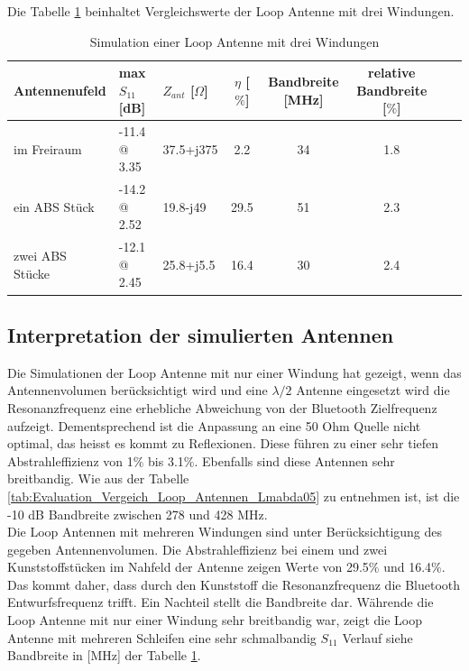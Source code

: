 Die Tabelle \ref{tab:Evaluation_Vergeich_Loop_Antennen_Coil} beinhaltet Vergleichswerte der Loop Antenne mit drei Windungen.
\begin{table}[!h]
 \centering
 \begin{tabular}{p{3cm} p{3cm} l c c c c r} 
 \toprule 
 Antennenufeld & max $S_{11}$ [dB]		& $Z_{ant}$ [$\Omega$] 	& $\eta$ [$\%$] & Bandbreite [MHz] & relative Bandbreite [$\%$]\\ 
 \midrule
im Freiraum 		&	-11.4 @ 3.35		& 	37.5+j375	& 	2.2		& 34		& 1.8\\ 					 		
ein ABS Stück 	& -14.2 @ 2.52 		&	19.8-j49		&	29.5		& 51	 	& 2.3\\
zwei ABS Stücke 	& -12.1 @ 2.45 		&	25.8+j5.5	&	16.4		& 30 	& 2.4\\
 \bottomrule
 \end{tabular}
 \caption{Simulation einer Loop Antenne mit drei Windungen }
 \label{tab:Evaluation_Vergeich_Loop_Antennen_Coil}
\end{table}

\subsection{Interpretation der simulierten Antennen}
Die Simulationen der Loop Antenne mit nur einer Windung hat gezeigt, wenn das Antennenvolumen berücksichtigt wird und eine $\lambda/2$ Antenne eingesetzt wird die Resonanzfrequenz eine erhebliche Abweichung von der Bluetooth Zielfrequenz aufzeigt. Dementsprechend ist die Anpassung an eine 50 Ohm Quelle nicht optimal, das heisst es kommt zu Reflexionen. Diese führen zu einer sehr tiefen  Abstrahleffizienz von 1$\%$ bis 3.1$\%$. Ebenfalls sind diese Antennen sehr breitbandig. Wie aus der Tabelle \ref{tab:Evaluation_Vergeich_Loop_Antennen_Lmabda05} zu entnehmen ist, ist die -10 dB Bandbreite zwischen 278 und 428 MHz.\\
Die Loop Antennen mit mehreren Windungen sind unter Berücksichtigung des gegeben Antennenvolumen. Die Abstrahleffizienz bei einem und zwei Kunststoffstücken im Nahfeld der Antenne zeigen Werte von 29.5$\%$ und 16.4$\%$. Das kommt daher, dass durch den Kunststoff die Resonanzfrequenz die Bluetooth Entwurfsfrequenz trifft. Ein Nachteil stellt die Bandbreite dar. Währende die Loop Antenne mit nur einer Windung sehr breitbandig war, zeigt die Loop Antenne mit mehreren Schleifen eine sehr schmalbandig $S_{11}$ Verlauf siehe Bandbreite in [MHz] der Tabelle \ref{tab:Evaluation_Vergeich_Loop_Antennen_Coil}.



